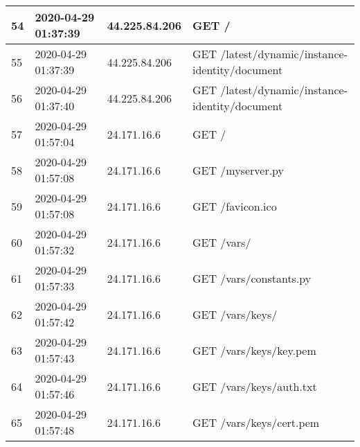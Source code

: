 \documentclass[12pt]{article}
\begin{document}
\begin{longtable}{|l|l|l|l|}
54  & 2020-04-29 01:37:39 & 44.225.84.206   & GET /                                                                                                                               \\ \hline
55  & 2020-04-29 01:37:39 & 44.225.84.206   & GET /latest/dynamic/instance-identity/document                                                                                      \\ \hline
56  & 2020-04-29 01:37:40 & 44.225.84.206   & GET /latest/dynamic/instance-identity/document                                                                                      \\ \hline
57  & 2020-04-29 01:57:04 & 24.171.16.6     & GET /                                                                                                                               \\ \hline
58  & 2020-04-29 01:57:08 & 24.171.16.6     & GET /myserver.py                                                                                                                    \\ \hline
59  & 2020-04-29 01:57:08 & 24.171.16.6     & GET /favicon.ico                                                                                                                    \\ \hline
60  & 2020-04-29 01:57:32 & 24.171.16.6     & GET /vars/                                                                                                                          \\ \hline
61  & 2020-04-29 01:57:33 & 24.171.16.6     & GET /vars/constants.py                                                                                                              \\ \hline
62  & 2020-04-29 01:57:42 & 24.171.16.6     & GET /vars/keys/                                                                                                                     \\ \hline
63  & 2020-04-29 01:57:43 & 24.171.16.6     & GET /vars/keys/key.pem                                                                                                              \\ \hline
64  & 2020-04-29 01:57:46 & 24.171.16.6     & GET /vars/keys/auth.txt                                                                                                             \\ \hline
65  & 2020-04-29 01:57:48 & 24.171.16.6     & GET /vars/keys/cert.pem                                                                                                             \\ \hline

\end{longtable}
\end{document}
